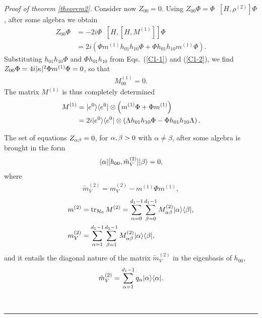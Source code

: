 \documentclass[aps,pra,letterpaper,twocolumn,showpacs,superscriptaddress,floatfix,longbibliography]{revtex4-1}
\newcommand{\traccazero}{\mathop{\mathrm{tr}_{\mathcal{H}_0}}\limits}
\newenvironment{proof}[1][Proof]{\noindent\textit{#1.} }{\
  \rule{0.5em}{0.5em}}
\begin{document}
\begin{proof}[Proof of theorem \ref{theorem2}]
  Consider now $Z_{00}=0$. Using $Z_{00}\Phi = \Phi \traccazero
  [H,\rho^{(2)}] \Phi$, after some algebra we obtain
  \begin{align}
    Z_{00}\Phi &= - 2i \Phi \traccazero [H,[H,M^{(1)}]] \Phi \nonumber
    \\ &= 2 i \left( \Phi m^{(1)} h_{01}h_{10} \Phi + \Phi
      h_{01}h_{10} m^{(1)} \Phi \right).
    \label{Eq Z00}
  \end{align}
  Substituting $h_{01}h_{10} \Phi$ and $\Phi h_{01}h_{10}$ from
  Eqs.~(\ref{C1-1}) and (\ref{C1-2}), we find $Z_{00}\Phi=4 i |\kappa|^2
  \Phi m^{(1)} \Phi =0$, so that
  \begin{align}
    M^{(1)}_{00} =0.
    \label{Eq M1_00=0}
  \end{align}
  The matrix $M^{(1)}$ is thus completely determined
  \begin{align}
    M^{(1)} &= |{e^0}\rangle\langle{e^0}|\otimes \left( m^{(1)} \Phi + \Phi
      m^{(1)} \right) \nonumber \\ &= 2 i |{e^0}\rangle\langle{e^0}|\otimes
    \left( \Lambda h_{01}h_{10} \Phi - \Phi h_{01}h_{10} \Lambda
    \right).
    \label{ResultM1}
  \end{align}

  The set of equations $Z_{\alpha\beta}=0$, for $\alpha,\beta>0$ with $\alpha
  \neq \beta$, after some algebra is brought in the form
  \begin{align}
    \langle{\alpha}| [h_{00},{\tilde{m}}^{(2)}_V] |{\beta}\rangle=0,
  \end{align}
  where
  \begin{align}
    \tilde{m}^{(2)}_V= m^{(2)}_V- m^{(1)}\Phi m^{(1)},
    \label{DefM2tilde}
  \end{align}
  \begin{align}
    & m^{(2)}=\traccazero M^{(2)}=
    \sum_{\alpha=0}^{d_1-1}\sum_{\beta=0}^{d_1-1} M^{(2)}_{\alpha
      \beta} \ket{\alpha}\bra{\beta}, \\
    &m^{(2)}_V=\sum_{\alpha=1}^{d_1-1}\sum_{\beta=1}^{d_1-1}
    M^{(2)}_{\alpha \beta} \ket{\alpha}\bra{\beta},
  \end{align}
  and it entails the diagonal nature of the matrix $\tilde{m}^{(2)}_V$
  in the eigenbasis of $h_{00}$,
  \begin{align}
    {\tilde{m}}^{(2)}_V = \sum_{\alpha=1}^{d_1-1} q_\alpha
    |{\alpha}\rangle\langle{\alpha}|.
    \label{Eigenbasis_m2tilde}
  \end{align}


\end{proof}
\end{document}
